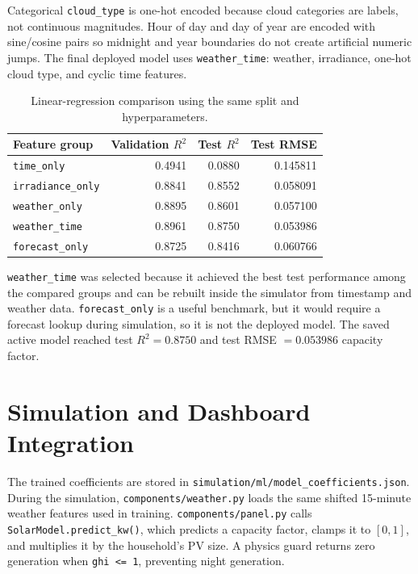 \documentclass[paper=a4, fontsize=11pt]{scrartcl}
\begin{document}
Categorical \texttt{cloud\_type} is one-hot encoded because cloud categories
are labels, not continuous magnitudes. Hour of day and day of year are encoded
with sine/cosine pairs so midnight and year boundaries do not create artificial
numeric jumps. The final deployed model uses \texttt{weather\_time}: weather,
irradiance, one-hot cloud type, and cyclic time features.

\begin{table}[h]
\centering
\begin{tabular}{lrrr}
\toprule
\textbf{Feature group} & \textbf{Validation \(R^2\)} & \textbf{Test \(R^2\)} & \textbf{Test RMSE} \\
\midrule
\texttt{time\_only} & 0.4941 & 0.0880 & 0.145811 \\
\texttt{irradiance\_only} & 0.8841 & 0.8552 & 0.058091 \\
\texttt{weather\_only} & 0.8895 & 0.8601 & 0.057100 \\
\texttt{weather\_time} & 0.8961 & 0.8750 & 0.053986 \\
\texttt{forecast\_only} & 0.8725 & 0.8416 & 0.060766 \\
\bottomrule
\end{tabular}
\caption{Linear-regression comparison using the same split and hyperparameters.}
\end{table}

\texttt{weather\_time} was selected because it achieved the best test
performance among the compared groups and can be rebuilt inside the simulator
from timestamp and weather data. \texttt{forecast\_only} is a useful benchmark,
but it would require a forecast lookup during simulation, so it is not the
deployed model. The saved active model reached test \(R^2 = 0.8750\) and test
RMSE \(= 0.053986\) capacity factor.

\section{Simulation and Dashboard Integration}

The trained coefficients are stored in
\texttt{simulation/ml/model\_coefficients.json}. During the simulation,
\texttt{components/weather.py} loads the same shifted 15-minute weather
features used in training. \texttt{components/panel.py} calls
\texttt{SolarModel.predict\_kw()}, which predicts a capacity factor, clamps it
to \([0, 1]\), and multiplies it by the household's PV size. A physics guard
returns zero generation when \texttt{ghi <= 1}, preventing night generation.
\end{document}
